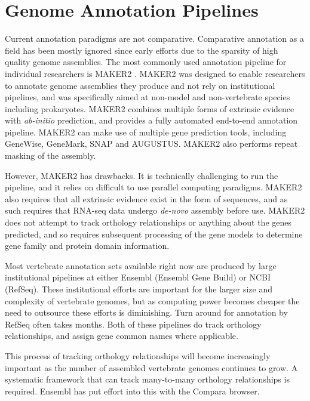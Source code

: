 \documentclass[fleqn,10pt]{wlscirep}
\begin{document}
\section{Genome Annotation Pipelines}
Current annotation paradigms are not comparative. Comparative annotation as a field has been mostly ignored since early efforts due to the sparsity of high quality genome assemblies. The most commonly used annotation pipeline for individual researchers is MAKER2 \cite{cantarel2008maker}. MAKER2 was designed to enable researchers to annotate genome assemblies they produce and not rely on institutional pipelines, and was specifically aimed at non-model and non-vertebrate species including prokaryotes. MAKER2 combines multiple forms of extrinsic evidence with \textit{ab-initio} prediction, and provides a fully automated end-to-end annotation pipeline. MAKER2 can make use of multiple gene prediction tools, including GeneWise, GeneMark, SNAP and AUGUSTUS. MAKER2 also performs repeat masking of the assembly.

However, MAKER2 has drawbacks. It is technically challenging to run the pipeline, and it relies on difficult to use parallel computing paradigms. MAKER2 also requires that all extrinsic evidence exist in the form of sequences, and as such requires that RNA-seq data undergo \textit{de-novo} assembly before use. MAKER2 does not attempt to track orthology relationships or anything about the genes predicted, and so requires subsequent processing of the gene models to determine gene family and protein domain information. 

Most vertebrate annotation sets available right now are produced by large institutional pipelines at either Ensembl (Ensembl Gene Build) or NCBI (RefSeq). These institutional efforts are important for the larger size and complexity of vertebrate genomes, but as computing power becomes cheaper the need to outsource these efforts is diminishing. Turn around for annotation by RefSeq often takes months. Both of these pipelines do track orthology relationships, and assign gene common names where applicable.

This process of tracking orthology relationships will become increasingly important as the number of assembled vertebrate genomes continues to grow. A systematic framework that can track many-to-many orthology relationships is required. Ensembl has put effort into this with the Compara browser\cite{vilella2009ensemblcompara}.
\end{document}

